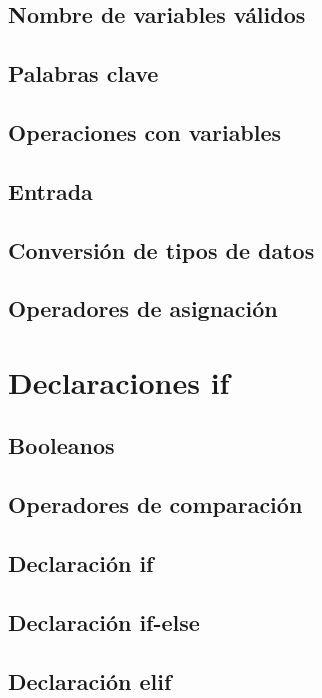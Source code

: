 \documentclass{article}
\begin{document}
\subsection{Nombre de variables válidos}

\subsection{Palabras clave}

\subsection{Operaciones con variables}

\subsection{Entrada}

\subsection{Conversión de tipos de datos}

\subsection{Operadores de asignación}

\section{Declaraciones if}

\subsection{Booleanos}

\subsection{Operadores de comparación}

\subsection{Declaración if}

\subsection{Declaración if-else}

\subsection{Declaración elif}
\end{document}
